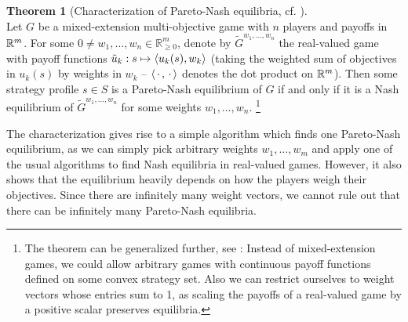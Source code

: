 \documentclass[a4paper,DIV=11,abstracton,twoside=semi]{scrreprt}
\newcommand{\Rp}{\mathbb{R}_{\geq 0}}
\theoremstyle{definition}
\newtheorem{thm}{Theorem}[chapter] %
\begin{document}
    \begin{thm}[Characterization of Pareto-Nash equilibria, cf. \cite{bib:shapleyMultiobjectiveEquilibriumPoints,bib:paretoNashEquilibria}]~\\
        Let $G$ be a mixed-extension multi-objective game with $n$ players and payoffs in $\mathbb{R}^m$. 
        For some $0 \neq w_1, \dots, w_n \in \Rp^m$, denote by $\tilde{G}^{w_1, \dots, w_n}$ the real-valued game with payoff functions
        $\tilde{u}_k: s \mapsto \left\langle u_k(s), w_k \right\rangle$ (taking the weighted sum of objectives in $u_k(s)$ by weights in $w_k$ -- $\left\langle \,\cdot\,, \,\cdot\, \right\rangle$ denotes the dot product on $\mathbb{R}^m$).
        Then some strategy profile $s \in S$ is a Pareto-Nash equilibrium of $G$ if and only if it is a Nash equilibrium of $\tilde{G}^{w_1, \dots, w_n}$ for some weights $w_1, \dots, w_n$.
        \footnote{The theorem can be generalized further, see \cite{bib:shapleyMultiobjectiveEquilibriumPoints,bib:paretoNashEquilibria}: Instead of mixed-extension games, we could allow arbitrary games with continuous payoff functions defined on some convex strategy set.
        Also we can restrict ourselves to weight vectors whose entries sum to 1, as scaling the payoffs of a real-valued game by a positive scalar preserves equilibria.
        }
        \label{thm:paretoNashEquilibriaWeightingCharacterization}
    \end{thm}

    The characterization gives rise to a simple algorithm which finds one Pareto-Nash equilibrium, as we can simply pick arbitrary weights $w_1, \dots, w_m$ and apply one of the usual algorithms to find Nash equilibria in real-valued games.
    However, it also shows that the equilibrium heavily depends on how the players weigh their objectives. Since there are infinitely many weight vectors, we cannot rule out that there can be infinitely many Pareto-Nash equilibria. 
    
\end{document}

